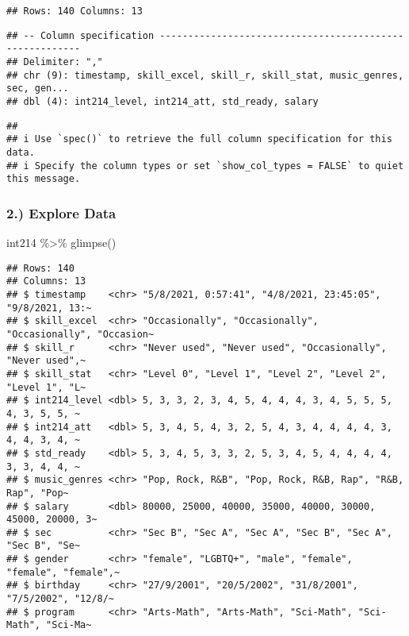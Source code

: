 \documentclass[
]{article}
\newenvironment{Shaded}{\begin{snugshade}}{\end{snugshade}}
\newcommand{\FunctionTok}[1]{\textcolor[rgb]{0.00,0.00,0.00}{#1}}
\newcommand{\NormalTok}[1]{#1}
\newcommand{\SpecialCharTok}[1]{\textcolor[rgb]{0.00,0.00,0.00}{#1}}
\begin{document}
\begin{verbatim}
## Rows: 140 Columns: 13
\end{verbatim}

\begin{verbatim}
## -- Column specification --------------------------------------------------------
## Delimiter: ","
## chr (9): timestamp, skill_excel, skill_r, skill_stat, music_genres, sec, gen...
## dbl (4): int214_level, int214_att, std_ready, salary
\end{verbatim}

\begin{verbatim}
## 
## i Use `spec()` to retrieve the full column specification for this data.
## i Specify the column types or set `show_col_types = FALSE` to quiet this message.
\end{verbatim}

\hypertarget{explore-data}{%
\subsubsection{2.) Explore Data}\label{explore-data}}

\begin{Shaded}
\begin{Highlighting}[]
\NormalTok{int214 }\SpecialCharTok{\%\textgreater{}\%} \FunctionTok{glimpse}\NormalTok{()}
\end{Highlighting}
\end{Shaded}

\begin{verbatim}
## Rows: 140
## Columns: 13
## $ timestamp    <chr> "5/8/2021, 0:57:41", "4/8/2021, 23:45:05", "9/8/2021, 13:~
## $ skill_excel  <chr> "Occasionally", "Occasionally", "Occasionally", "Occasion~
## $ skill_r      <chr> "Never used", "Never used", "Occasionally", "Never used",~
## $ skill_stat   <chr> "Level 0", "Level 1", "Level 2", "Level 2", "Level 1", "L~
## $ int214_level <dbl> 5, 3, 3, 2, 3, 4, 5, 4, 4, 4, 3, 4, 5, 5, 5, 4, 3, 5, 5, ~
## $ int214_att   <dbl> 5, 3, 4, 5, 4, 3, 2, 5, 4, 3, 4, 4, 4, 4, 3, 4, 4, 3, 4, ~
## $ std_ready    <dbl> 5, 3, 4, 5, 3, 3, 2, 5, 3, 4, 5, 4, 4, 4, 4, 3, 3, 4, 4, ~
## $ music_genres <chr> "Pop, Rock, R&B", "Pop, Rock, R&B, Rap", "R&B, Rap", "Pop~
## $ salary       <dbl> 80000, 25000, 40000, 35000, 40000, 30000, 45000, 20000, 3~
## $ sec          <chr> "Sec B", "Sec A", "Sec A", "Sec B", "Sec A", "Sec B", "Se~
## $ gender       <chr> "female", "LGBTQ+", "male", "female", "female", "female",~
## $ birthday     <chr> "27/9/2001", "20/5/2002", "31/8/2001", "7/5/2002", "12/8/~
## $ program      <chr> "Arts-Math", "Arts-Math", "Sci-Math", "Sci-Math", "Sci-Ma~
\end{verbatim}
\end{document}
